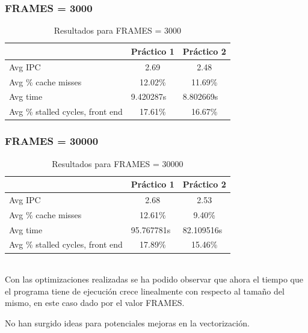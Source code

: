 \documentclass[a4paper,10pt]{article}
\begin{document}
\subsubsection*{FRAMES = 3000}
\begin{table}[h]
\centering
\begin{tabular}{|l|c|c|}
\hline
                                 & \multicolumn{1}{l|}{Práctico 1} & \multicolumn{1}{l|}{Práctico 2} \\ \hline
Avg IPC                          & 2.69                            & 2.48                            \\ \hline
Avg \% cache misses              & 12.02\%                         & 11.69\%                         \\ \hline
Avg time                         & \multicolumn{1}{l|}{9.420287s}  & \multicolumn{1}{l|}{8.802669s}  \\ \hline
Avg \% stalled cycles, front end & 17.61\%                         & 16.67\%                         \\ \hline
\end{tabular}
\caption{Resultados para FRAMES = 3000}
\label{my-label}
\end{table}

\subsubsection*{FRAMES = 30000}
\begin{table}[h]
\centering
\begin{tabular}{|l|c|c|}
\hline
                                 & \multicolumn{1}{l|}{Práctico 1} & \multicolumn{1}{l|}{Práctico 2} \\ \hline
Avg IPC                          & 2.68                            & 2.53                            \\ \hline
Avg \% cache misses              & 12.61\%                         & 9.40\%                          \\ \hline
Avg time                         & \multicolumn{1}{l|}{95.767781s} & \multicolumn{1}{l|}{82.109516s} \\ \hline
Avg \% stalled cycles, front end & 17.89\%                         & 15.46\%                         \\ \hline
\end{tabular}
\caption{Resultados para FRAMES = 30000}
\label{my-label}
\end{table}

\\
Con las optimizaciones realizadas se ha podido observar que ahora el tiempo que el programa tiene
de ejecución crece linealmente con respecto al tamaño del mismo, en este caso dado por el valor
FRAMES.  

No han surgido ideas para potenciales mejoras en la vectorización.
\end{document}
